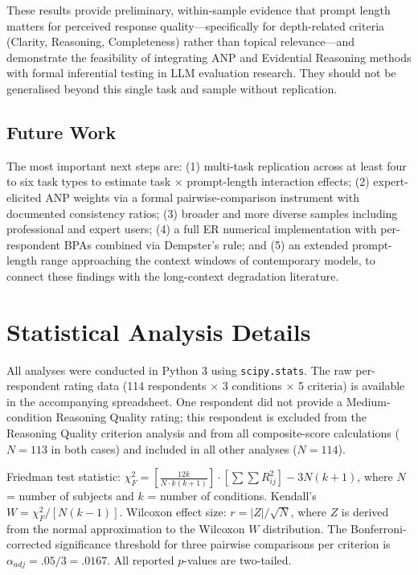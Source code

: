 \documentclass[conference]{IEEEtran}
\begin{document}
These results provide preliminary, within-sample evidence that prompt length matters for perceived response quality---specifically for depth-related criteria (Clarity, Reasoning, Completeness) rather than topical relevance---and demonstrate the feasibility of integrating ANP and Evidential Reasoning methods with formal inferential testing in LLM evaluation research. They should not be generalised beyond this single task and sample without replication.

\subsection*{Future Work}
The most important next steps are: (1) multi-task replication across at least four to six task types to estimate task $\times$ prompt-length interaction effects; (2) expert-elicited ANP weights via a formal pairwise-comparison instrument with documented consistency ratios; (3) broader and more diverse samples including professional and expert users; (4) a full ER numerical implementation with per-respondent BPAs combined via Dempster's rule; and (5) an extended prompt-length range approaching the context windows of contemporary models, to connect these findings with the long-context degradation literature.




\appendices
\section{Statistical Analysis Details}
All analyses were conducted in Python 3 using \texttt{scipy.stats}. The raw per-respondent rating data (114 respondents $\times$ 3 conditions $\times$ 5 criteria) is available in the accompanying spreadsheet. One respondent did not provide a Medium-condition Reasoning Quality rating; this respondent is excluded from the Reasoning Quality criterion analysis and from all composite-score calculations ($N=113$ in both cases) and included in all other analyses ($N=114$).

Friedman test statistic: $\chi^2_F = \left[\frac{12k}{N \cdot k(k+1)}\right] \cdot \left[\sum\sum R_{ij}^2\right] - 3N(k+1)$, where $N$ = number of subjects and $k$ = number of conditions. Kendall's $W = \chi^2_F / [N(k-1)]$. Wilcoxon effect size: $r = |Z|/\sqrt{N}$, where $Z$ is derived from the normal approximation to the Wilcoxon $W$ distribution. The Bonferroni-corrected significance threshold for three pairwise comparisons per criterion is $\alpha_{adj} = .05/3 = .0167$. All reported $p$-values are two-tailed.
\end{document}

